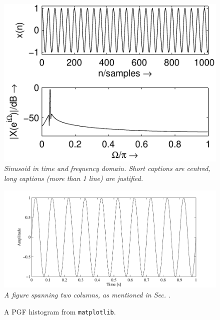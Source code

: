 \documentclass[twoside,a4paper]{article}
\begin{document}
\begin{figure}[ht]
\centerline{\includegraphics[scale=0.8]{fft_plot2}}
\caption{\label{fft_plot}{\it Sinusoid in time and frequency domain. Short captions are centred, long captions (more than 1 line) are justified.}}
\end{figure}
%
\begin{figure}[ht]
\center
\includegraphics[width=5in]{TwoColumnSine2}
\caption{\label{ftt_plot2}{\it A figure spanning two columns, as mentioned in Sec. . }}
\end{figure}



\begin{figure}
    \begin{center}
      
    \end{center}
    \caption{A PGF histogram from \texttt{matplotlib}.}
\end{figure}
\end{document}
